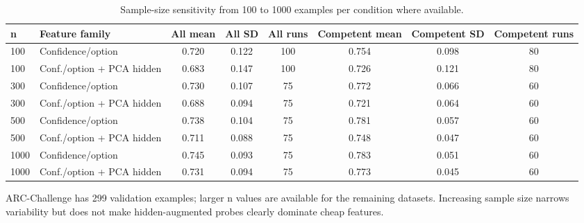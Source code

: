\begin{table}[t]
\centering
\small
\caption{Sample-size sensitivity from 100 to 1000 examples per condition where available.}
\label{tab:sample-size}
\begin{threeparttable}
\begin{tabular}{llcccccc}
\toprule
n & Feature family & All mean & All SD & All runs & Competent mean & Competent SD & Competent runs \\
\midrule
100 & Confidence/option & 0.720 & 0.122 & 100 & 0.754 & 0.098 & 80 \\
100 & Conf./option + PCA hidden & 0.683 & 0.147 & 100 & 0.726 & 0.121 & 80 \\
300 & Confidence/option & 0.730 & 0.107 & 75 & 0.772 & 0.066 & 60 \\
300 & Conf./option + PCA hidden & 0.688 & 0.094 & 75 & 0.721 & 0.064 & 60 \\
500 & Confidence/option & 0.738 & 0.104 & 75 & 0.781 & 0.057 & 60 \\
500 & Conf./option + PCA hidden & 0.711 & 0.088 & 75 & 0.748 & 0.047 & 60 \\
1000 & Confidence/option & 0.745 & 0.093 & 75 & 0.783 & 0.051 & 60 \\
1000 & Conf./option + PCA hidden & 0.731 & 0.094 & 75 & 0.773 & 0.045 & 60 \\
\bottomrule
\end{tabular}

\begin{tablenotes}[flushleft]\footnotesize\item \parbox{0.95\textwidth}{ARC-Challenge has 299 validation examples; larger n values are available for the remaining datasets. Increasing sample size narrows variability but does not make hidden-augmented probes clearly dominate cheap features.}\end{tablenotes}
\end{threeparttable}
\end{table}
